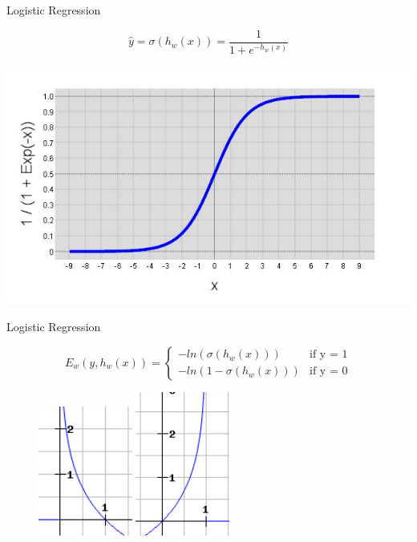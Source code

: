 \begin{frame}{Logistic Regression}

\[ \hat{y} = \sigma(h_w(x)) = \frac{1}{1+e^{-h_w(x)}} \]

\includegraphics[scale=0.5]{prediction/sigmoid}

\end{frame}	


\begin{frame}{Logistic Regression}


\[E_w(y,h_w(x)) = \begin{cases}
	-ln(\sigma(h_w(x))) &\text{if y = 1}\\	
	-ln(1-\sigma(h_w(x))) &\text{if y = 0}
\end{cases}\]
%

\begin{figure}
   \includegraphics[width=0.275\textwidth]{prediction/lna.png}
   \hfill
   \includegraphics[width=0.275\textwidth]{prediction/lnb.png}
\end{figure}

\end{frame}

